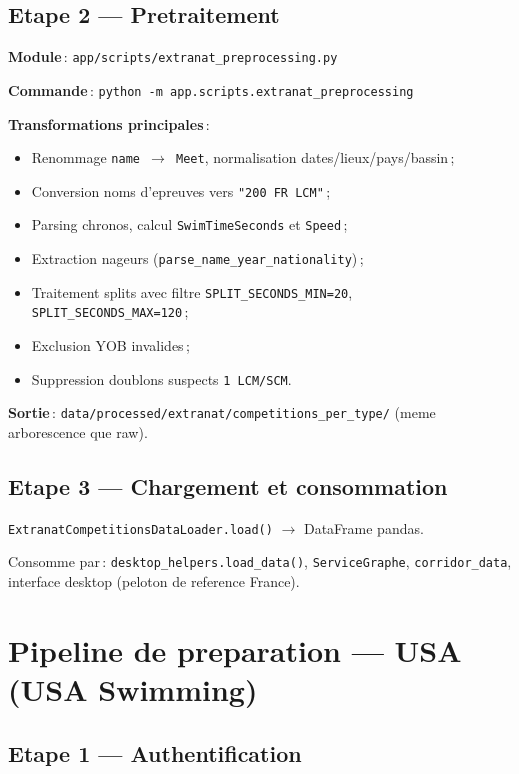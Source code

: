 \documentclass[11pt,a4paper]{article}
\begin{document}
\subsection{Etape 2 --- Pretraitement}

\textbf{Module}\,: \texttt{app/scripts/extranat\_preprocessing.py}

\textbf{Commande}\,: \texttt{python -m app.scripts.extranat\_preprocessing}

\textbf{Transformations principales}\,:
\begin{itemize}
  \item Renommage \texttt{name $\rightarrow$ Meet}, normalisation dates/lieux/pays/bassin\,;
  \item Conversion noms d'epreuves vers \texttt{"200 FR LCM"}\,;
  \item Parsing chronos, calcul \texttt{SwimTimeSeconds} et \texttt{Speed}\,;
  \item Extraction nageurs (\texttt{parse\_name\_year\_nationality})\,;
  \item Traitement splits avec filtre \texttt{SPLIT\_SECONDS\_MIN=20}, \texttt{SPLIT\_SECONDS\_MAX=120}\,;
  \item Exclusion YOB invalides\,;
  \item Suppression doublons suspects \texttt{1 LCM/SCM}.
\end{itemize}

\textbf{Sortie}\,: \texttt{data/processed/extranat/competitions\_per\_type/} (meme arborescence que raw).

\subsection{Etape 3 --- Chargement et consommation}

\texttt{ExtranatCompetitionsDataLoader.load()} $\rightarrow$ DataFrame pandas.

Consomme par\,: \texttt{desktop\_helpers.load\_data()}, \texttt{ServiceGraphe}, \texttt{corridor\_data}, interface desktop (peloton de reference France).

\section{Pipeline de preparation --- USA (USA Swimming)}

\subsection{Etape 1 --- Authentification}
\end{document}
